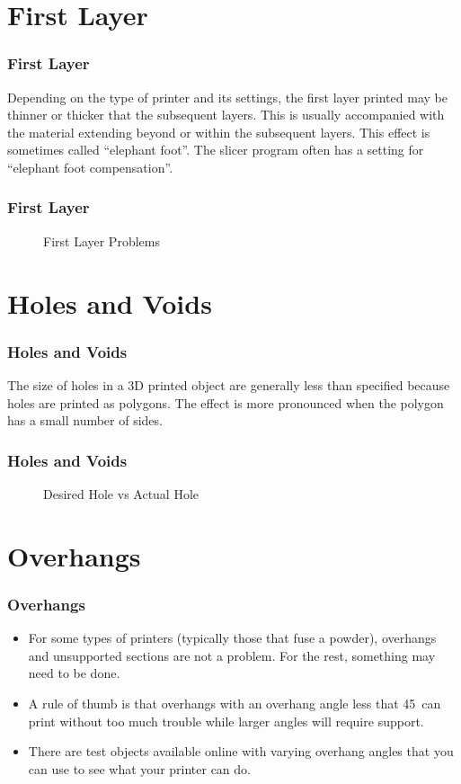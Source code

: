 \documentclass[english,10pt]{beamer}
\begin{document}
\section{First Layer}
\begin{frame}
  \frametitle{First Layer}
  Depending on the type of printer and its settings, the first layer printed may be thinner or thicker that the subsequent layers.  This is usually accompanied with the material extending beyond or within the subsequent layers.  This effect is sometimes called ``elephant foot''.  The slicer program often has a setting for ``elephant foot compensation''.
\end{frame}
\begin{frame}
  \frametitle{First Layer}
  \begin{figure}
    
    \caption{First Layer Problems}
  \end{figure}
\end{frame}

\section{Holes and Voids}
\begin{frame}
  \frametitle{Holes and Voids}
  The size of holes in a 3D printed object are generally less than specified because holes are printed as polygons.  The effect is more pronounced when the polygon has a small number of sides.
\end{frame}

\begin{frame}
  \frametitle{Holes and Voids}
  \begin{figure}
    
    \caption{Desired Hole vs Actual Hole}
  \end{figure}
\end{frame}

\section{Overhangs}
\begin{frame}
  \frametitle{Overhangs}
  \begin{itemize}
    \item For some types of printers (typically those that fuse a powder), overhangs and unsupported sections are not a problem.  For the rest, something may need to be done.
    \item A rule of thumb is that overhangs with an overhang angle less that 45\degree\ can print without too much trouble while larger angles will require support.
    \item There are test objects available online with varying overhang angles that you can use to see what your printer can do.
  \end{itemize}
\end{frame}
\end{document}
